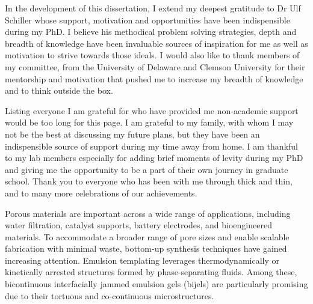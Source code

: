 \begin{front} %


In the development of this dissertation, I extend my deepest gratitude to Dr Ulf Schiller whose support, motivation and 
opportunities have been indispensible during my PhD. I believe his methodical problem solving strategies, depth and 
breadth of knowledge have been invaluable sources of inspiration for me as well as 
motivation to strive towards those ideals. I would also like to thank members of my committee, 
from the University of Delaware and Clemson University for their mentorship 
and motivation that pushed me to increase my breadth of knowledge and to think outside the box.

Listing everyone I am grateful for who have provided me non-academic support would be too long for this page. 
I am grateful to my family, with whom I may not be the best at 
discussing my future plans, but they have been an indispensible source of support during my time away from home. 
I am thankful to my lab members especially for adding brief moments of levity during my PhD and giving me the 
opportunity to be a part of their own journey in graduate school. Thank you to everyone who has been with me 
through thick and thin, and to many more celebrations of our achievements. 




\maketocloflot

    Porous materials are important across a wide range of applications, including water filtration, catalyst supports, 
    battery electrodes, and bioengineered materials. To accommodate a broader range of pore sizes and enable scalable 
    fabrication with minimal waste, bottom-up synthesis techniques have gained increasing attention. Emulsion templating 
    leverages thermodynamically or kinetically arrested structures formed by phase-separating fluids. Among these, bicontinuous 
    interfacially jammed emulsion gels (bijels) are particularly promising due to their tortuous and co-continuous microstructures.


\end{front}

